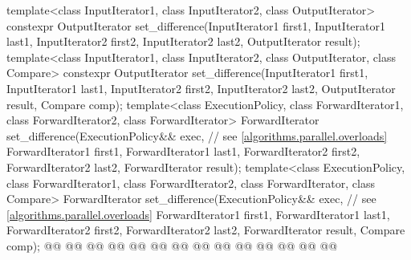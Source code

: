 \begin{codeblock}
{  template<class InputIterator1, class InputIterator2, class OutputIterator>
    constexpr OutputIterator
      set_difference(InputIterator1 first1, InputIterator1 last1,
                     InputIterator2 first2, InputIterator2 last2,
                     OutputIterator result);
  template<class InputIterator1, class InputIterator2, class OutputIterator, class Compare>
    constexpr OutputIterator
      set_difference(InputIterator1 first1, InputIterator1 last1,
                     InputIterator2 first2, InputIterator2 last2,
                     OutputIterator result, Compare comp);
  template<class ExecutionPolicy, class ForwardIterator1, class ForwardIterator2,
           class ForwardIterator>
    ForwardIterator
      set_difference(ExecutionPolicy&& exec, // see \ref{algorithms.parallel.overloads}
                     ForwardIterator1 first1, ForwardIterator1 last1,
                     ForwardIterator2 first2, ForwardIterator2 last2,
                     ForwardIterator result);
  template<class ExecutionPolicy, class ForwardIterator1, class ForwardIterator2,
           class ForwardIterator, class Compare>
    ForwardIterator
      set_difference(ExecutionPolicy&& exec, // see \ref{algorithms.parallel.overloads}
                     ForwardIterator1 first1, ForwardIterator1 last1,
                     ForwardIterator2 first2, ForwardIterator2 last2,
                     ForwardIterator result, Compare comp);
  @@
    @@
        @@
      @@
      @@
        @@
                       @@
    @@
        @@
      @@
      @@
        @@
                       @@
  @\added{\}}@

}
\end{codeblock}
